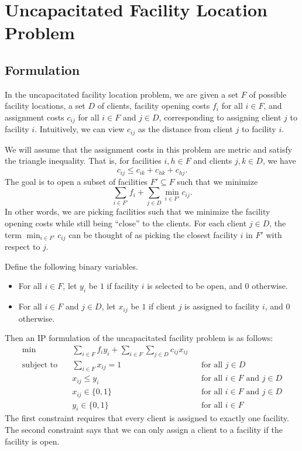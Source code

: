 \section{Uncapacitated Facility Location Problem} \label{sec:8}

\subsection{Formulation} \label{subsec:8.1}
In the uncapacitated facility location problem, we are given a set $F$ 
of possible facility locations, a set $D$ of clients, facility opening 
costs $f_i$ for all $i \in F$, and assignment costs $c_{ij}$ for all 
$i \in F$ and $j \in D$, corresponding to assigning client $j$ to 
facility $i$. Intuitively, we can view $c_{ij}$ as the distance from client 
$j$ to facility $i$. 

We will assume that the assignment costs in this problem are metric and satisfy 
the triangle inequality. That is, for facilities $i, h \in F$ and 
clients $j, k \in D$, we have 
\[ c_{ij} \leq c_{ik} + c_{hk} + c_{hj}. \] 
The goal is to open a subset of facilities $F' \subseteq F$ such that 
we minimize 
\[ \sum_{i \in F'} f_i + \sum_{j \in D} \min_{i\in F'} c_{ij}. \] 
In other words, we are picking facilities such that we minimize the 
facility opening costs while still being ``close'' to the clients. 
For each client $j \in D$, the term $\min_{i\in F'} c_{ij}$ can be thought of as 
picking the closest facility $i$ in $F'$ with respect to $j$. 
 
Define the following binary variables.
\begin{itemize}
    \item For all $i \in F$, let $y_i$ be $1$ if facility $i$ is selected to be 
    open, and $0$ otherwise.
    \item For all $i \in F$ and $j \in D$, let $x_{ij}$ be $1$ if client $j$ is 
    assigned to facility $i$, and $0$ otherwise. 
\end{itemize}
Then an IP formulation of the uncapacitated facility problem is as follows:
\begin{align*}
    \min\quad & \sum_{i\in F} f_i y_i + \sum_{i\in F} \sum_{j\in D} c_{ij} x_{ij} \\ 
    \text{subject to}\quad & \sum_{i\in F} x_{ij} = 1
    && \text{for all $j \in D$} \\
    & x_{ij} \leq y_i && \text{for all $i \in F$ and $j \in D$} \\
    & x_{ij} \in \{0, 1\} && \text{for all $i \in F$ and $j \in D$} \\ 
    & y_i \in \{0, 1\} && \text{for all $i \in F$}
\end{align*}
The first constraint requires that every client is assigned to 
exactly one facility. The second constraint says that we can only 
assign a client to a facility if the facility is open. 

